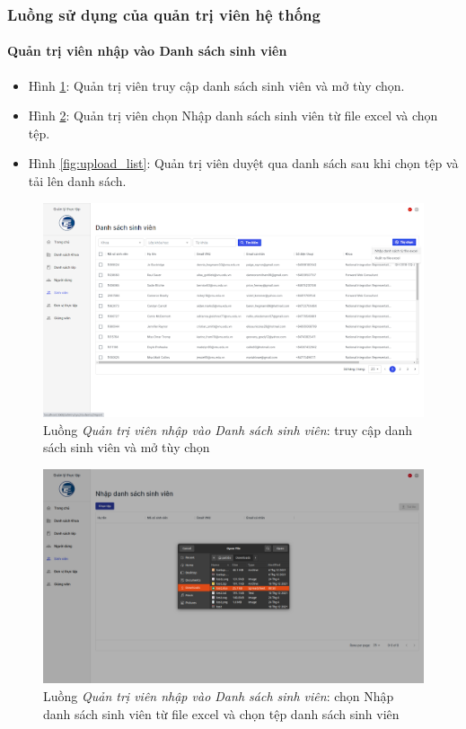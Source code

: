 \documentclass[./../main.tex]{subfiles}
\begin{document}
\subsubsection{Luồng sử dụng của quản trị viên hệ thống}

\paragraph*{Quản trị viên nhập vào Danh sách sinh viên}

\begin{itemize}
	\item Hình \ref{fig:admin_access_list_students}: Quản trị viên truy cập danh sách sinh viên và mở tùy chọn.
	\item Hình \ref{fig:choose_file}: Quản trị viên chọn Nhập danh sách sinh viên từ file excel và chọn tệp.
	\item Hình \ref{fig:upload_list}: Quản trị viên duyệt qua danh sách sau khi chọn tệp và tải lên danh sách.
\end{itemize}

\begin{figure}[]
	\includegraphics[width=\linewidth]{./images/image68.png}
	\caption{Luồng \emph{Quản trị viên nhập vào Danh sách sinh viên}: truy cập danh sách sinh viên và mở tùy chọn}
	\label{fig:admin_access_list_students}
\end{figure}

\begin{figure}[]
	\includegraphics[width=\linewidth]{./images/image27.png}
	\caption{Luồng \emph{Quản trị viên nhập vào Danh sách sinh viên}: chọn Nhập danh sách sinh viên từ file excel và chọn tệp danh sách sinh viên}
	\label{fig:choose_file}
\end{figure}
\end{document}

